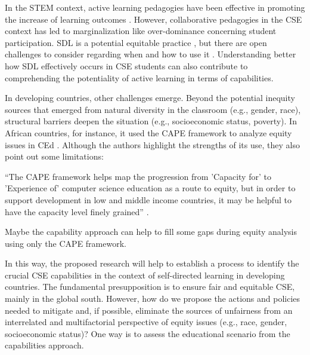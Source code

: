 In the \gls{STEM} context, active learning pedagogies have been effective in promoting the increase of learning outcomes \cite{prince:2004}. However, collaborative pedagogies in the \gls{CSE} context has led to marginalization \cite{lewis:2015} like over-dominance concerning student participation. \gls{SDL} is a potential equitable practice \cite{anderson:2022}, but there are open challenges to consider regarding when and how to use it \cite{brookfield:1993}. Understanding better how \gls{SDL} effectively occurs in \gls{CSE} students can also contribute to comprehending the potentiality of active learning in terms of capabilities.

In developing countries, other challenges emerge. Beyond the potential inequity sources that emerged from natural diversity in the classroom (e.g., gender, race), structural barriers deepen the situation (e.g., socioeconomic status, poverty). In African countries, for instance, it used the \gls{CAPE} framework to analyze equity issues in \gls{CEd} \cite{tshukudu:2023}. Although the authors highlight the strengths of its use, they also point out some limitations: 
\begin{citacao}
    ``The \gls{CAPE} framework helps map the progression from 'Capacity for' to 'Experience of' computer science education as a route to equity, but in order to support development in low and middle income countries, it may be helpful to have the capacity level finely grained'' \cite[p.~1]{tshukudu:2023}.
\end{citacao}
Maybe the capability approach can help to fill some gaps during equity analysis using only the \gls{CAPE} framework.

 In this way, the proposed research will help to establish a process to identify the crucial \gls{CSE} capabilities in the context of self-directed learning in developing countries. The fundamental presupposition is to ensure fair and equitable \gls{CSE}, mainly in the global south. However, how do we propose the actions and policies needed to mitigate and, if possible, eliminate the sources of unfairness from an interrelated and multifactorial perspective of equity issues (e.g., race, gender, socioeconomic status)? One way is to assess the educational scenario from the capabilities approach.